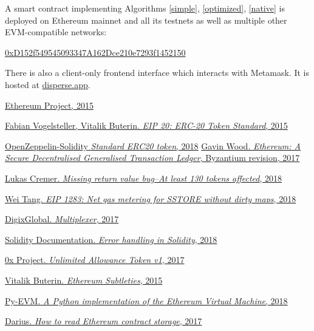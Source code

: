\documentclass[12pt]{article}
\begin{document}
A smart contract implementing Algorithms \ref{simple}, \ref{optimized}, \ref{native} is deployed on Ethereum mainnet and all its testnets as well as multiple other EVM-compatible networks:

\begin{center}
\href{https://etherscan.io/address/0xD152f549545093347A162Dce210e7293f1452150}{0xD152f549545093347A162Dce210e7293f1452150}	
\end{center}

There is also a client-only frontend interface which interacts with Metamask. It is hosted at \href{https://disperse.app/}{disperse.app}.


\begin{thebibliography}{1}

 \href{https://www.ethereum.org}{Ethereum Project, 2015}
 
  \href{https://eips.ethereum.org/EIPS/eip-20}{Fabian Vogelsteller, Vitalik Buterin. {\em EIP 20: ERC-20 Token Standard}, 2015}

  \href{https://github.com/OpenZeppelin/openzeppelin-solidity/blob/v2.0.0/contracts/token/ERC20/ERC20.sol#L151-L164}{OpenZeppelin-Solidity {\em Standard ERC20 token}, 2018}
  \href{http://gavwood.com/paper.pdf}{Gavin Wood. {\em Ethereum: A Secure Decentralised Generalised Transaction Ledger}, Byzantium revision, 2017}
 	
  \href{https://medium.com/p/d67bf08521ca}{Lukas Cremer. {\em Missing return value bug--At least 130 tokens affected}, 2018}
 	
  \href{https://eips.ethereum.org/EIPS/eip-1283}{Wei Tang. {\em EIP 1283: Net gas metering for SSTORE without dirty maps}, 2018}
 	
  \href{https://github.com/DigixGlobal/multiplexer}{DigixGlobal. {\em Multiplexer}, 2017}
 	
  \href{https://solidity.readthedocs.io/en/latest/control-structures.html#error-handling-assert-require-revert-and-exceptions}{Solidity Documentation. {\em Error handling in Solidity}, 2018}
 	
  \href{https://github.com/0xProject/0x-monorepo/blob/48ff13e3e22bf9f71bc1a367f86aaa0ae89989ae/packages/contracts/contracts/tokens/ZRXToken/UnlimitedAllowanceToken_v1.sol#L43-L45}{0x Project. {\em Unlimited Allowance Token v1}, 2017}
 
 \href{https://github.com/ethereum/wiki/wiki/Subtleties}{Vitalik Buterin. {\em Ethereum Subtleties}, 2015}
 
 \href{https://github.com/ethereum/py-evm}{Py-EVM. {\em A Python implementation of the Ethereum Virtual Machine}, 2018}

 \href{https://medium.com/aigang-network/how-to-read-ethereum-contract-storage-44252c8af925}{Darius. {\em How to read Ethereum contract storage}, 2017}

\end{thebibliography}
\end{document}
